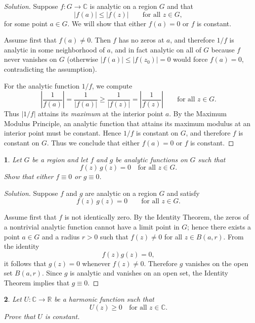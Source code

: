 \documentclass[12pt, a4paper]{report}
\theoremstyle{spaced}
\newtheorem{exercise}{}
\newcommand{\setexercise}[1]{\setcounter{exercise}{#1-1}}
\begin{document}
\begin{proof}[Solution]
	Suppose $f : G \to \mathbb{C}$ is analytic on a region $G$ and that
	\[
		|f(a)| \le |f(z)| \qquad \text{for all } z\in G,
	\]
	for some point $a\in G$.
	We will show that either $f(a)=0$ or $f$ is constant.

	Assume first that $f(a)\neq 0$.
	Then $f$ has no zeros at $a$, and therefore $1/f$ is analytic in some neighborhood of $a$, and in fact analytic on all of $G$ because $f$ never vanishes on $G$ (otherwise $|f(a)|\le |f(z_0)|=0$ would force $f(a)=0$, contradicting the assumption).

	For the analytic function $1/f$, we compute
	\[
		\left|\frac{1}{f(a)}\right|
		= \frac{1}{|f(a)|}
		\ge \frac{1}{|f(z)|}
		= \left|\frac{1}{f(z)}\right|
		\qquad \text{for all } z\in G.
	\]
	Thus $|1/f|$ attains its \emph{maximum} at the interior point $a$.
	By the Maximum Modulus Principle, an analytic function that attains its maximum modulus at an interior point must be constant.
	Hence $1/f$ is constant on $G$, and therefore $f$ is constant on $G$.
	Thus we conclude that either $f(a)=0$ or $f$ is constant.
\end{proof}


\setexercise{8}
\begin{exercise}
	Let $G$ be a region and let $f$ and $g$ be analytic functions on $G$ such that
	\[
		f(z)\,g(z)=0 \quad \text{for all } z \in G.
	\]
	Show that either $f \equiv 0$ or $g \equiv 0$.
\end{exercise}

\begin{proof}[Solution]
	Suppose $f$ and $g$ are analytic on a region $G$ and satisfy
	\[
		f(z)\,g(z)=0 \qquad \text{for all } z\in G.
	\]

	Assume first that $f$ is not identically zero.
	By the Identity Theorem, the zeros of a nontrivial analytic function cannot have a limit point in $G$; hence there exists a point $a\in G$ and a radius $r>0$ such that
	\(f(z)\neq 0\) for all \(z\in B(a,r).\)
	From the identity
	\[
		f(z)g(z)=0,
	\]
	it follows that $g(z)=0$ whenever $f(z)\neq 0$.
	Therefore $g$ vanishes on the open set $B(a,r)$.
	Since $g$ is analytic and vanishes on an open set, the Identity Theorem implies that
	\(
	g\equiv0.
	\)
\end{proof}

\setexercise{9}
\begin{exercise}
	Let $U \colon \mathbb{C} \to \mathbb{R}$ be a harmonic function such that
	\[
		U(z) \ge 0 \quad \text{for all } z\in \mathbb{C}.
	\]
	Prove that $U$ is constant.
\end{exercise}
\end{document}
